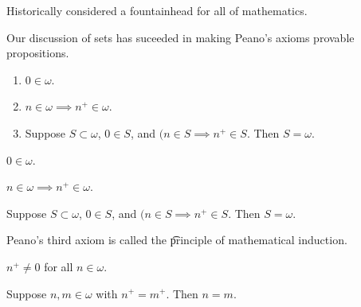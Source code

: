 

Historically considered a fountainhead for all of mathematics.


Our discussion of sets has suceeded in making Peano's axioms provable propositions.

\begin{enumerate}
  \item $0 \in \omega$.
  \item $n \in \omega \implies n^+ \in \omega$.
  \item Suppose $S \subset \omega$, $0 \in S$, and $(n \in S \implies n^+ \in S$.
  Then $S = \omega$.
\end{enumerate}

\begin{proposition}
  $0 \in \omega$.
\end{proposition}

\begin{proposition}
  $n \in \omega \implies n^+ \in \omega$.
\end{proposition}

\begin{proposition}
  Suppose $S \subset \omega$, $0 \in S$, and $(n \in S \implies n^+ \in S$.
  Then $S = \omega$.
\end{proposition}


Peano's third axiom is called the \t{principle of mathematical induction}.

\begin{proposition}
  $n^+ \neq 0$ for all $n \in \omega$.
\end{proposition}

\begin{proposition}
  Suppose $n, m \in \omega$ with $n^+ = m^+$.
  Then $n = m$.
\end{proposition}
